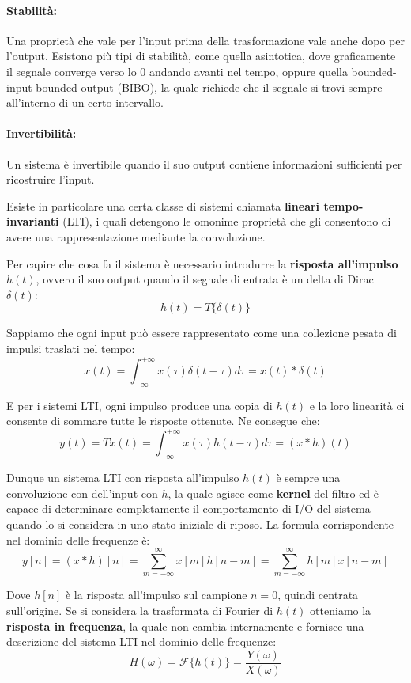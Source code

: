 \paragraph{Stabilità:} Una proprietà che vale per l'input prima della trasformazione vale anche dopo per l'output. Esistono più tipi di stabilità, come
quella asintotica, dove graficamente il segnale converge verso lo $0$ andando avanti nel tempo, oppure quella bounded-input bounded-output (BIBO), la
quale richiede che il segnale si trovi sempre all'interno di un certo intervallo.

\paragraph{Invertibilità:} Un sistema è invertibile quando il suo output contiene informazioni sufficienti per ricostruire l'input.\newline

\noindent Esiste in particolare una certa classe di sistemi chiamata \textbf{lineari tempo-invarianti} (LTI), i quali detengono le omonime proprietà che
gli consentono di avere una rappresentazione mediante la convoluzione.\par
Per capire che cosa fa il sistema è necessario introdurre la \textbf{risposta all'impulso} $h(t)$, ovvero il suo output quando il segnale di entrata è
un delta di Dirac $\delta(t)$: \[
	h(t) = T\{\delta(t)\}
\]

\noindent Sappiamo che ogni input può essere rappresentato come una collezione pesata di impulsi traslati nel tempo: \[
	x(t) = \int_{-\infty}^{+\infty} x(\tau)\delta(t-\tau) d\tau = x(t)*\delta(t)
\]

\noindent E per i sistemi LTI, ogni impulso produce una copia di $h(t)$ e la loro linearità ci consente di sommare tutte le risposte ottenute. Ne
consegue che: \[
	y(t) = T{x}(t) = \int_{-\infty}^{+\infty} x(\tau)h(t-\tau) d\tau = (x*h)(t)
\]

\noindent Dunque un sistema LTI con risposta all'impulso $h(t)$ è sempre una convoluzione con dell'input con $h$, la quale agisce come \textbf{kernel}
del filtro ed è capace di determinare completamente il comportamento di I/O del sistema quando lo si considera in uno stato iniziale di riposo. La
formula corrispondente nel dominio delle frequenze è: \[
	y[n] = (x*h)[n] = \sum_{m = -\infty}^{\infty} x[m]h[n-m] =
		\sum_{m=-\infty}^{\infty} h[m]x[n-m]
\]

\noindent Dove $h[n]$ è la risposta all'impulso sul campione $n=0$, quindi centrata sull'origine. Se si considera la trasformata di Fourier di $h(t)$
otteniamo la \textbf{risposta in frequenza}, la quale non cambia internamente e fornisce una descrizione del sistema LTI nel dominio delle frequenze: \[
	H(\omega) = \mathcal{F}\{h(t)\} = \frac{Y(\omega)}{X(\omega)}
\]

